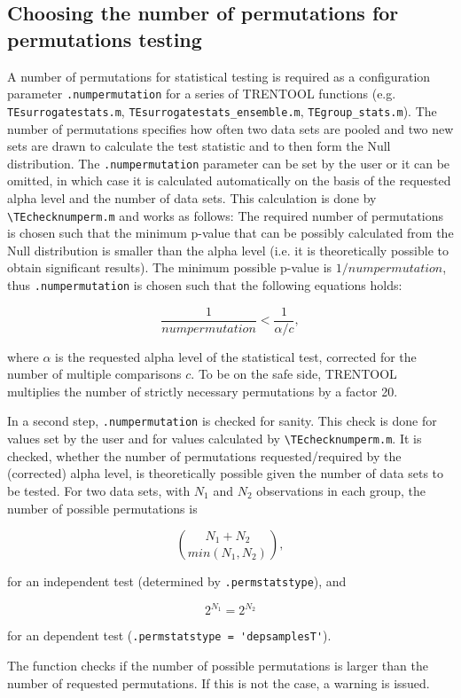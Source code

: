 \documentclass[a4paper,10pt]{article}
\begin{document}
\subsection{Choosing the number of permutations for permutations testing} \label{sec:numperm}
A number of permutations for statistical testing is required as a configuration parameter \verb&.numpermutation& for a series of TRENTOOL functions (e.g. \verb&TEsurrogatestats.m&, \verb&TEsurrogatestats_ensemble.m&, \verb&TEgroup_stats.m&). The number of permutations specifies how often two data sets are pooled and two new sets are drawn to calculate the test statistic and to then form the Null distribution. The \verb&.numpermutation& parameter can be set by the user or it can be omitted, in which case it is calculated automatically on the basis of the requested alpha level and the number of data sets. This calculation is done by \verb&\TEchecknumperm.m& and works as follows: The required number of permutations is chosen such that the minimum p-value that can be possibly calculated from the Null distribution is smaller than the alpha level (i.e. it is theoretically possible to obtain significant results). The minimum possible p-value is $1/numpermutation$, thus \verb&.numpermutation& is chosen such that the following equations holds:

\[
 \frac{1}{numpermutation} < \frac{1}{\alpha/c},
\]

where $\alpha$ is the requested alpha level of the statistical test, corrected for the number of multiple comparisons $c$. To be on the safe side, TRENTOOL multiplies the number of strictly necessary permutations by a factor 20.

In a second step, \verb&.numpermutation& is checked for sanity. This check is done for values set by the user and for values calculated by \verb&\TEchecknumperm.m&. It is checked, whether the number of permutations requested/required by the (corrected) alpha level, is theoretically possible given the number of data sets to be tested. For two data sets, with $N_1$ and $N_2$ observations in each group, the number of possible permutations is 

\[
 \binom{N_1+N_2}{min(N_1,N_2)},
\]

for an independent test (determined by \verb&.permstatstype&), and

\[
 2^{N_1} = 2^{N_2}
\]

for an dependent test (\verb&.permstatstype = 'depsamplesT'&).

The function checks if the number of possible permutations is larger than the number of requested permutations. If this is not the case, a warning is issued.
\end{document}
